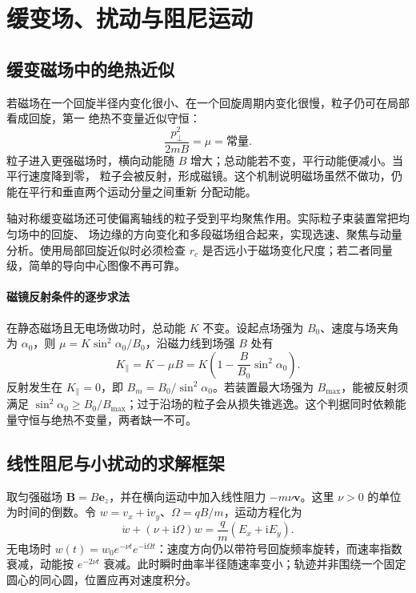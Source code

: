 {\section{缓变场、扰动与阻尼运动}

\subsection{缓变磁场中的绝热近似}


若磁场在一个回旋半径内变化很小、在一个回旋周期内变化很慢，粒子仍可在局部看成回旋，第一
绝热不变量近似守恒：
\begin{equation}
 \boxed{\frac{p_\perp^2}{2mB}=\mu=\text{常量}}.
\end{equation}
粒子进入更强磁场时，横向动能随 $B$ 增大；总动能若不变，平行动能便减小。当平行速度降到零，
粒子会被反射，形成磁镜。这个机制说明磁场虽然不做功，仍能在平行和垂直两个运动分量之间重新
分配动能。

轴对称缓变磁场还可使偏离轴线的粒子受到平均聚焦作用。实际粒子束装置常把均匀场中的回旋、
场边缘的方向变化和多段磁场组合起来，实现选速、聚焦与动量分析。使用局部回旋近似时必须检查
$r_c$ 是否远小于磁场变化尺度；若二者同量级，简单的导向中心图像不再可靠。


\paragraph{磁镜反射条件的逐步求法}
在静态磁场且无电场做功时，总动能 $K$ 不变。设起点场强为 $B_0$、速度与场夹角为 $\alpha_0$，则
$\mu=K\sin^2\alpha_0/B_0$，沿磁力线到场强 $B$ 处有
\[
 K_\parallel=K-\mu B
 =K\left(1-\frac B{B_0}\sin^2\alpha_0\right).
\]
反射发生在 $K_\parallel=0$，即 $B_m=B_0/\sin^2\alpha_0$。若装置最大场强为 $B_{\max}$，能被反射须满足
$\sin^2\alpha_0\ge B_0/B_{\max}$；过于沿场的粒子会从损失锥逃逸。这个判据同时依赖能量守恒与绝热不变量，两者缺一不可。


\subsection{线性阻尼与小扰动的求解框架}
取匀强磁场 $\boldsymbol B=B\boldsymbol e_z$，并在横向运动中加入线性阻力 $-m\nu\boldsymbol v$。这里 $\nu>0$ 的单位为时间的倒数。令 $w=v_x+\mathrm i v_y$、$\Omega=qB/m$，运动方程化为
\[
 \dot w+(\nu+\mathrm i\Omega)w=\frac q m(E_x+\mathrm iE_y).
\]
无电场时 $w(t)=w_0e^{-\nu t}e^{-\mathrm i\Omega t}$：速度方向仍以带符号回旋频率旋转，而速率指数衰减，动能按 $e^{-2\nu t}$ 衰减。此时瞬时曲率半径随速率变小；轨迹并非围绕一个固定圆心的同心圆，位置应再对速度积分。

}
